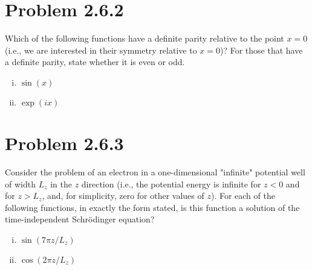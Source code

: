 \pagebreak

\section*{Problem 2.6.2}

Which of the following functions have a definite parity relative to
the point $x = 0$ (i.e., we are
interested in their symmetry relative to $x = 0$)? For those that
have a definite parity, state whether it
is even or odd.

\begin{enumerate}[(i)]
  \item $\sin(x)$


  \item $\exp(ix)$


\end{enumerate}

\pagebreak

\section*{Problem 2.6.3}

Consider the problem of an electron in a one-dimensional "infinite"
potential well of width $L_z$ in
the $z$ direction (i.e., the potential energy is infinite for $z < 0$ and
  for $z > L_z$, and, for simplicity, zero
for other values of $z$). For each of the following functions, in
exactly the form stated, is this function
a solution of the time-independent Schrödinger equation?

\begin{enumerate}[(i)]
  \item $\sin(7\pi z / L_z)$


  \item $\cos(2\pi z / L_z)$


\end{enumerate}

